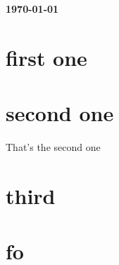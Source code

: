 \documentclass[17pt]{extarticle}
\begin{document}


\begin{flushright}
{\bf \today}
\end{flushright}

\tableofcontents

\clearpage

\section{first one}





\section{second one}

That's the second one

\section{third}

\section{fo}
\end{document}
